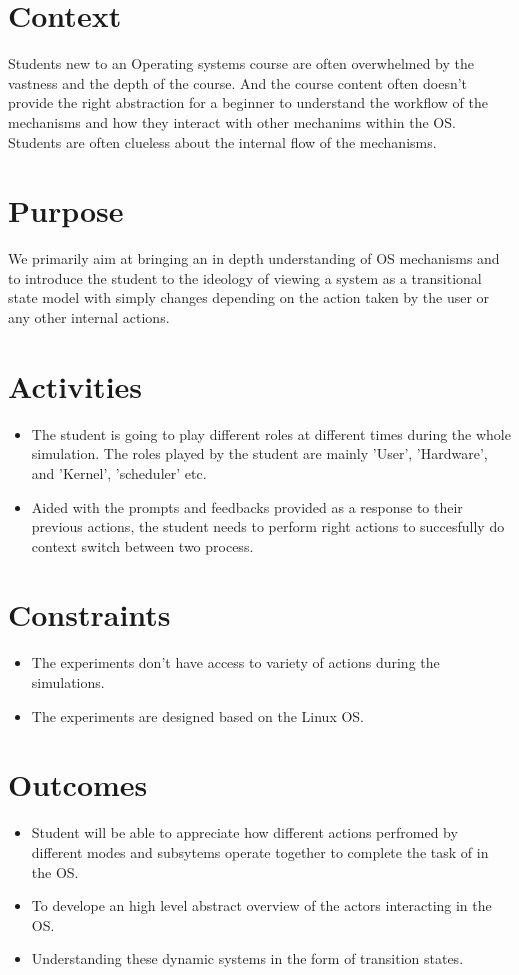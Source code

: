 \documentclass[11pt]{article}
\author{Bhargavi}
\date{\today}
\title{}
\begin{document}
\tableofcontents

\section{Context}
\label{sec:orgc76e48f}
Students new to an Operating systems course are often overwhelmed by the vastness and the depth of the course. And the course content often doesn't provide the right abstraction for a beginner to understand the workflow of the mechanisms and how they interact with other mechanims within the OS. Students are often clueless about the internal flow of the mechanisms.

\section{Purpose}
\label{sec:org723c3db}
We primarily aim at bringing an in depth understanding of OS mechanisms and to introduce the student to the ideology of viewing a system as a transitional state model with simply changes depending on the action taken by the user or any other internal actions.

\section{Activities}
\label{sec:org25953d6}
\begin{itemize}
\item The student is going to play different roles at different times during the whole simulation. The roles played by the student are mainly 'User', 'Hardware', and 'Kernel', 'scheduler' etc.
\item Aided with the prompts and feedbacks provided as a response to their previous actions, the student needs to perform right actions to succesfully do context switch between two process.
\end{itemize}

\section{Constraints}
\label{sec:org23cc95a}
\begin{itemize}
\item The experiments don't have access to variety of actions during the simulations.
\item The experiments are designed based on the Linux OS.
\end{itemize}

\section{Outcomes}
\label{sec:org753d80c}
\begin{itemize}
\item Student will be able to appreciate how different actions perfromed by different modes and subsytems operate together to complete the task of in the OS.
\item To develope an high level abstract overview of the actors interacting in the OS.
\item Understanding these dynamic systems in the form of transition states.
\end{itemize}
\end{document}
